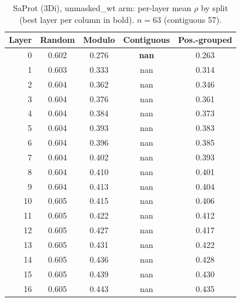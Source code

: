 \documentclass[11pt,a4paper]{article}
\begin{document}
\begin{table}[H]\centering\small

\caption{SaProt (3Di), unmasked\_wt arm: per-layer mean $\rho$ by split (best layer per column in bold). $n=63$ (contiguous 57).}

\label{tab:S2SaProt3Diunmasked_wt}

\begin{tabular}{rcccc}

\toprule

Layer & Random & Modulo & Contiguous & Pos.-grouped \\

\midrule

0 & 0.602 & 0.276 & \textbf{nan} & 0.263 \\

1 & 0.603 & 0.333 & nan & 0.314 \\

2 & 0.604 & 0.362 & nan & 0.346 \\

3 & 0.604 & 0.376 & nan & 0.361 \\

4 & 0.604 & 0.384 & nan & 0.373 \\

5 & 0.604 & 0.393 & nan & 0.383 \\

6 & 0.604 & 0.396 & nan & 0.385 \\

7 & 0.604 & 0.402 & nan & 0.393 \\

8 & 0.604 & 0.410 & nan & 0.401 \\

9 & 0.604 & 0.413 & nan & 0.404 \\

10 & 0.605 & 0.415 & nan & 0.406 \\

11 & 0.605 & 0.422 & nan & 0.412 \\

12 & 0.605 & 0.427 & nan & 0.417 \\

13 & 0.605 & 0.431 & nan & 0.422 \\

14 & 0.605 & 0.436 & nan & 0.428 \\

15 & 0.605 & 0.439 & nan & 0.430 \\

16 & 0.605 & 0.443 & nan & 0.435 \\


\end{tabular}
\end{table}
\end{document}
